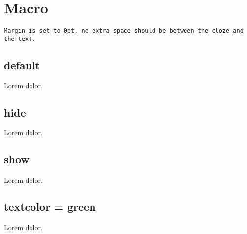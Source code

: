 \documentclass{article}
\begin{document}
{}

\section{Macro \texttt{\string\clozenol}}

\texttt{Margin is set to 0pt, no extra space should be between the cloze
and the text.}

\subsection{default}

Lorem  dolor.

\subsection{hide}

\clozehide

Lorem  dolor.

\subsection{show}

\clozeshow

Lorem  dolor.

\subsection{textcolor = green}


Lorem  dolor.
\end{document}

